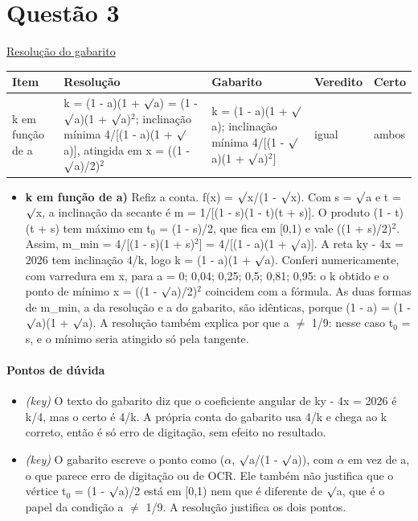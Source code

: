 \documentclass{article}%
\begin{document}
\section*{Questão 3}%
\href{https://poliedroresolve.sistemapoliedro.com.br/vestibulares/ime/2026/ime-2-fase-dia-1-23-10-2025-2-fase-dia-1/dissertativa-3-matematica-2-fase-dia-1-ime-2026}{Resolução do gabarito}\par\smallskip%
\begin{longtable}{@{}p{} p{} p{} p{} p{}@{}}\toprule Item & Resolução & Gabarito & Veredito & Certo \\ \midrule
k em função de a & k = (1 - a)(1 + $\surd$a) = (1 - $\surd$a)(1 + $\surd$a)$^2$; inclinação mínima 4/{[}(1 - a)(1 + $\surd$a){]}, atingida em x = ((1 - $\surd$a)/2)$^2$ & k = (1 - a)(1 + $\surd$a); inclinação mínima 4/{[}(1 - $\surd$a)(1 + $\surd$a)$^2${]} & igual & ambos \\
\bottomrule\end{longtable}%
\begin{itemize}%
\item%
\textbf{k em função de a)} Refiz a conta. f(x) = $\surd$x/(1 - $\surd$x). Com s = $\surd$a e t = $\surd$x, a inclinação da secante é m = 1/{[}(1 - s)(1 - t)(t + s){]}. O produto (1 - t)(t + s) tem máximo em t$_{0}$ = (1 - s)/2, que fica em {[}0,1) e vale ((1 + s)/2)$^2$. Assim, m\_min = 4/{[}(1 - s)(1 + s)$^2${]} = 4/{[}(1 - a)(1 + $\surd$a){]}. A reta ky - 4x = 2026 tem inclinação 4/k, logo k = (1 - a)(1 + $\surd$a). Conferi numericamente, com varredura em x, para a = 0; 0,04; 0,25; 0,5; 0,81; 0,95: o k obtido e o ponto de mínimo x = ((1 - $\surd$a)/2)$^2$ coincidem com a fórmula. As duas formas de m\_min, a da resolução e a do gabarito, são idênticas, porque (1 - a) = (1 - $\surd$a)(1 + $\surd$a). A resolução também explica por que a $\neq$ 1/9: nesse caso t$_{0}$ = s, e o mínimo seria atingido só pela tangente.%
\end{itemize}%
\paragraph{Pontos de dúvida}%
\begin{itemize}%
\item%
\textit{(key)} O texto do gabarito diz que o coeficiente angular de ky - 4x = 2026 é k/4, mas o certo é 4/k. A própria conta do gabarito usa 4/k e chega ao k correto, então é só erro de digitação, sem efeito no resultado.%
\item%
\textit{(key)} O gabarito escreve o ponto como ($\alpha$, $\surd$a/(1 - $\surd$a)), com $\alpha$ em vez de a, o que parece erro de digitação ou de OCR. Ele também não justifica que o vértice t$_{0}$ = (1 - $\surd$a)/2 está em {[}0,1) nem que é diferente de $\surd$a, que é o papel da condição a $\neq$ 1/9. A resolução justifica os dois pontos.%
\end{itemize}%
\end{document}
